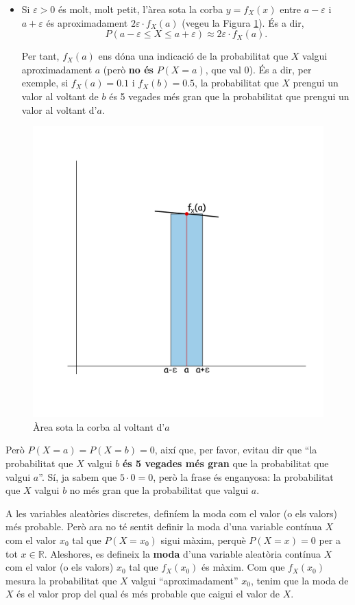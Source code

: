 \documentclass[
]{book}
\renewcommand{\leq}{\leqslant}
\theoremstyle{definition}
\theoremstyle{definition}
\theoremstyle{definition}
\theoremstyle{remark}
\begin{document}
\begin{itemize}
\item
  Si \(\varepsilon>0\) és molt, molt petit, l'àrea sota la corba \(y=f_X(x)\) entre \(a-\varepsilon\) i \(a+\varepsilon\) és aproximadament \(2\varepsilon\cdot f_X(a)\) (vegeu la Figura \ref{fig:epsilon}). És a dir,
  \[
  P(a-\varepsilon\leq X\leq a+\varepsilon)\approx 2\varepsilon\cdot f_X(a).
  \]

  Per tant, \(f_X(a)\) ens dóna una indicació de la probabilitat que \(X\) valgui aproximadament \(a\) (però \textbf{no és} \(P(X=a)\), que val 0). És a dir, per exemple, si \(f_X(a)=0.1\) i \(f_X(b)=0.5\), la probabilitat que \(X\) prengui un valor al voltant de \(b\) és 5 vegades més gran que la probabilitat que prengui un valor al voltant d'\(a\).
\end{itemize}

\begin{figure}

{\centering \includegraphics[width=0.6\linewidth]{Bioestadistica-II_files/figure-html/density} 

}

\caption{Àrea sota la corba al voltant d'$a$}\label{fig:epsilon}
\end{figure}

\begin{rmdrecordau}
Però \(P(X=a)=P(X=b)=0\), així que, per favor, evitau dir que ``la probabilitat que \(X\) valgui \(b\) \textbf{és 5 vegades més gran} que la probabilitat que valgui \(a\)''. Sí, ja sabem que \(5\cdot 0=0\), però la frase és enganyosa: la probabilitat que \(X\) valgui \(b\) no més gran que la probabilitat que valgui \(a\).
\end{rmdrecordau}

A les variables aleatòries discretes, definíem la moda com el valor (o els valors) més probable. Però ara no té sentit definir la moda d'una variable contínua \(X\) com el valor \(x_0\) tal que \(P(X=x_0)\) sigui màxim, perquè \(P(X=x)=0\) per a tot \(x\in \mathbb{R}\). Aleshores, es defineix la \textbf{moda} d'una variable aleatòria contínua \(X\) com el valor (o els valors) \(x_0\) tal que \(f_X(x_0)\) és màxim. Com que \(f_X(x_0)\) mesura la probabilitat que \(X\) valgui ``aproximadament'' \(x_0\), tenim que la moda de \(X\) és el valor prop del qual és més probable que caigui el valor de \(X\).
\end{document}
